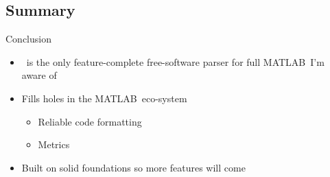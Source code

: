 \documentclass{beamer}
\newcommand{\mh}[0]{{\sc\structure{Miss\_Hit}}}
\begin{document}
\subsection{Summary}
\begin{frame}{Conclusion}
  \begin{itemize}
  \item \mh~is the only feature-complete free-software parser for full
    MATLAB\texttrademark\ I'm aware of
  \item Fills holes in the MATLAB\texttrademark\ eco-system
    \begin{itemize}
    \item Reliable code formatting
    \item Metrics
    \end{itemize}
  \item Built on solid foundations so more features will come
  \end{itemize}

  \vspace{12pt}

\end{frame}
\end{document}
